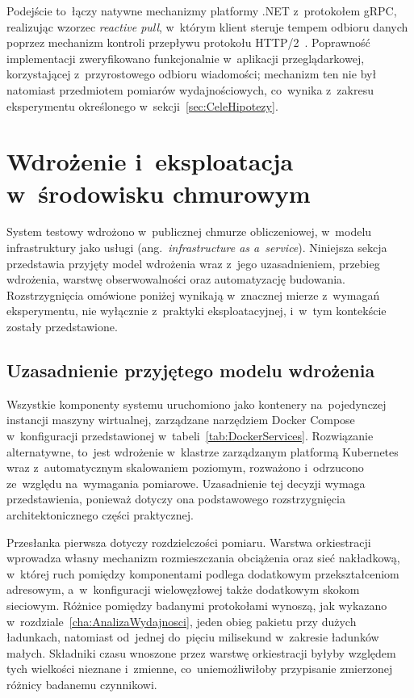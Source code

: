 Podejście to~łączy natywne mechanizmy platformy .NET z~protokołem gRPC, realizując wzorzec \textit{reactive pull}, w~którym klient steruje tempem odbioru danych poprzez mechanizm kontroli przepływu protokołu HTTP/2~\cite{bib:RFC9113}. Poprawność implementacji zweryfikowano funkcjonalnie w~aplikacji przeglądarkowej, korzystającej z~przyrostowego odbioru wiadomości; mechanizm ten nie był natomiast przedmiotem pomiarów wydajnościowych, co~wynika z~zakresu eksperymentu określonego w~sekcji~\ref{sec:CeleHipotezy}.

\section{Wdrożenie i~eksploatacja w~środowisku chmurowym}
\label{sec:WdrozenieChmurowe}

System testowy wdrożono w~publicznej chmurze obliczeniowej, w~modelu infrastruktury jako usługi (ang.\ \textit{infrastructure as a~service}). Niniejsza sekcja przedstawia przyjęty model wdrożenia wraz z~jego uzasadnieniem, przebieg wdrożenia, warstwę obserwowalności oraz automatyzację budowania. Rozstrzygnięcia omówione poniżej wynikają w~znacznej mierze z~wymagań eksperymentu, nie wyłącznie z~praktyki eksploatacyjnej, i~w~tym kontekście zostały przedstawione.

\subsection{Uzasadnienie przyjętego modelu wdrożenia}
\label{subsec:ModelWdrozenia}

Wszystkie komponenty systemu uruchomiono jako kontenery na~pojedynczej instancji maszyny wirtualnej, zarządzane narzędziem Docker Compose w~konfiguracji przedstawionej w~tabeli~\ref{tab:DockerServices}. Rozwiązanie alternatywne, to~jest wdrożenie w~klastrze zarządzanym platformą Kubernetes wraz z~automatycznym skalowaniem poziomym, rozważono i~odrzucono ze~względu na~wymagania pomiarowe. Uzasadnienie tej decyzji wymaga przedstawienia, ponieważ dotyczy ona podstawowego rozstrzygnięcia architektonicznego części praktycznej.

Przesłanka pierwsza dotyczy rozdzielczości pomiaru. Warstwa orkiestracji wprowadza własny mechanizm rozmieszczania obciążenia oraz sieć nakładkową, w~której ruch pomiędzy komponentami podlega dodatkowym przekształceniom adresowym, a~w~konfiguracji wielowęzłowej także dodatkowym skokom sieciowym. Różnice pomiędzy badanymi protokołami wynoszą, jak wykazano w~rozdziale~\ref{cha:AnalizaWydajnosci}, jeden obieg pakietu przy dużych ładunkach, natomiast od~jednej do~pięciu milisekund w~zakresie ładunków małych. Składniki czasu wnoszone przez warstwę orkiestracji byłyby względem tych wielkości nieznane i~zmienne, co~uniemożliwiłoby przypisanie zmierzonej różnicy badanemu czynnikowi.

